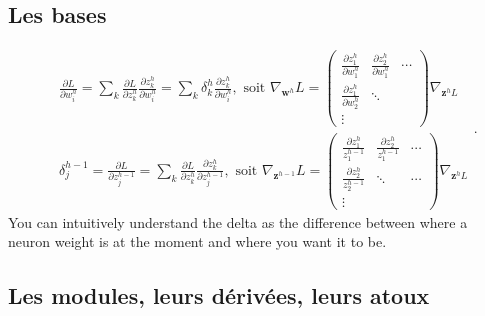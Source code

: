\documentclass{article}
\begin{document}
\subsection{Les bases}
\[
    \begin{aligned}
        & \frac{\partial L}{\partial w_i^h}=\sum_k \frac{\partial L}{\partial z_k^h} \frac{\partial z_k^h}{\partial w_i^h}=\sum_k \delta_k^h \frac{\partial z_k^h}{\partial w_i^h}, \text { soit } \nabla_{\mathbf{w}^h} L=\left(\begin{array}{ccc}
            \frac{\partial z_1^h}{\partial w_1^h} & \frac{\partial z_2^h}{\partial w_1^h} & \cdots \\
            \frac{\partial z_1^h}{\partial w_2^h} & \ddots & \\
            \vdots & &
        \end{array}\right) \nabla_{\mathbf{z}^h L} \\
        & \delta_j^{h-1}=\frac{\partial L}{\partial z_j^{h-1}}=\sum_k \frac{\partial L}{\partial z_k^h} \frac{\partial z_k^h}{\partial z_j^{h-1}}, \text { soit } \nabla_{\mathbf{z}^{h-1}} L=\left(\begin{array}{ccc}
            \frac{\partial z_1^h}{z_1^{h-1}} & \frac{\partial z_2^h}{z_1^{h-1}} & \cdots \\
            \frac{\partial z_2^h}{z_2^{h-1}} & \ddots & \cdots \\
        \vdots &
        \end{array}\right) \nabla_{\mathbf{z}^h L}
    \end{aligned}
.\]
You can intuitively understand the delta as the difference between where a neuron weight is at the moment and where you want it to be.

\subsection{Les modules, leurs dérivées, leurs atoux}
\end{document}
